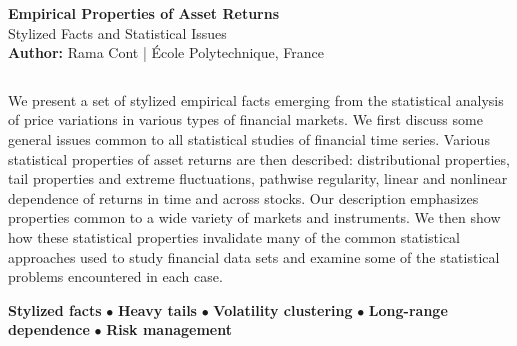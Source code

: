 \documentclass[final]{beamer}
\begin{document}
\begin{frame}[t]

\begin{tcolorbox}[colback=white,colframe=headerred,boxrule=2pt,arc=0pt,
    left=10pt,right=10pt,top=5pt,bottom=5pt]
\begin{minipage}{0.12\linewidth}
\centering
\end{minipage}
\hfill
\begin{minipage}{1.0\linewidth}
\centering
{\fontsize{65}{78}\selectfont\textbf{Empirical Properties of Asset Returns}}\\[0.3cm]
{\fontsize{48}{58}\selectfont Stylized Facts and Statistical Issues}\\[0.2cm]
{\Large\textbf{Author:} Rama Cont | École Polytechnique, France}
\end{minipage}
\end{tcolorbox}

\vspace{0.6cm}

\begin{columns}[t]

\begin{column}{.48\linewidth}

\begin{tcolorbox}[mybox, title=Abstract]
\large

We present a set of stylized empirical facts emerging from the statistical
analysis of price variations in various types of financial markets. We first
discuss some general issues common to all statistical studies of financial time
series. Various statistical properties of asset returns are then described:
distributional properties, tail properties and extreme fluctuations, pathwise
regularity, linear and nonlinear dependence of returns in time and across
stocks. Our description emphasizes properties common to a wide variety of
markets and instruments. We then show how these statistical properties
invalidate many of the common statistical approaches used to study financial
data sets and examine some of the statistical problems encountered in each
case.

\end{tcolorbox}

\vspace{0.5cm}

\begin{tcolorbox}[mybox, title=Keywords]
\large
\textbf{Stylized facts} $\bullet$ \textbf{Heavy tails} $\bullet$ \textbf{Volatility clustering} $\bullet$ \textbf{Long-range dependence} $\bullet$ \textbf{Risk management}
\end{tcolorbox}


\end{column}
\end{columns}
\end{frame}
\end{document}
